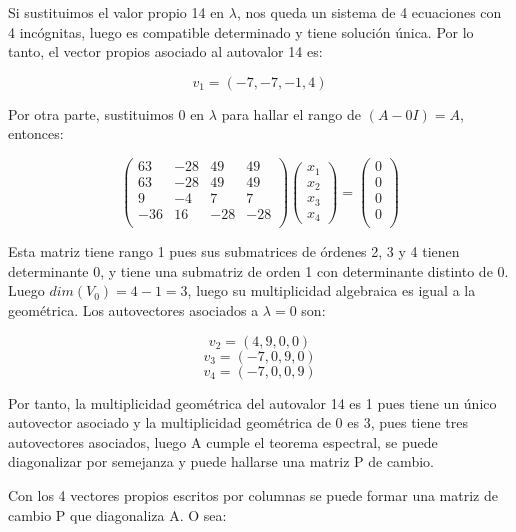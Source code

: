 \documentclass[11pt, a4paper]{article}
\newif\IfInSansMode
\theoremstyle{theorem-style}
\theoremstyle{definition-style}
\theoremstyle{remark-style}
\theoremstyle{example-style}
\begin{document}
Si sustituimos el valor propio 14 en $\lambda$, nos queda un sistema de 4 ecuaciones con 4 incógnitas, luego es compatible determinado y tiene solución única. Por lo tanto, el vector propios asociado al autovalor 14 es:

$$v_1=(-7,-7,-1,4)$$  

Por otra parte, sustituimos 0 en $\lambda$ para hallar el rango de $(A-0I) = A$, entonces:

$$\begin{pmatrix}
63 & -28 & 49 & 49\\
63 & -28 & 49 & 49\\
9 & -4 & 7 & 7\\
-36 & 16 & -28 & -28 \\ 
\end{pmatrix}\begin{pmatrix}
x_1\\
x_2\\
x_3\\
x_4
\end{pmatrix}=
\begin{pmatrix}
0\\
0\\
0\\
0\\
\end{pmatrix}$$

Esta matriz tiene rango 1 pues sus submatrices de órdenes 2, 3 y 4 tienen determinante 0, y tiene una submatriz de orden 1 con determinante distinto de 0. Luego $dim(V_{0})=4-1=3$, luego su multiplicidad algebraica es igual a la geométrica. Los autovectores asociados a $\lambda=0$ son:

$$v_2=(4,9,0,0)$$ $$v_3=(-7,0,9,0)$$ $$v_4=(-7,0,0,9)$$ 

Por tanto, la multiplicidad geométrica del autovalor 14 es 1 pues tiene un único autovector asociado y la multiplicidad geométrica de 0 es 3, pues tiene tres autovectores asociados, luego A cumple el teorema espectral, se puede diagonalizar por semejanza y puede hallarse una matriz P de cambio.

Con los 4 vectores propios escritos por columnas se puede formar una matriz de cambio P que diagonaliza A. O sea:
\end{document}
